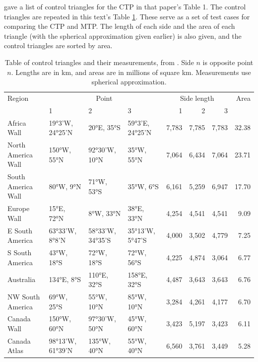 \documentclass[]{interact}
\begin{document}
\citet{christensen} gave a list of control triangles for the CTP in that
paper's Table 1. The control triangles are repeated in this text's Table
\ref{table:ctrlpts}. These serve as a set of test cases for comparing the CTP
and MTP. The length of each side and the area of each triangle
(with the spherical approximation
given earlier) is also given, and the control triangles are sorted by area.

\begin{table}
\begin{tabular}{ p{2.5cm} | p{1.3cm} p{1.3cm} p{1.4cm} | r r r | r }
Region & \multicolumn{3}{c}{Point} &
  \multicolumn{3}{c}{Side length} &  Area \\
& 1 & 2 & 3 & 1 & 2 & 3 & \\
\hline
Africa Wall & 19°3'W, 24°25'N & 20°E, 35°S & 59°3'E, 24°25'N &
  7,783 & 7,785 & 7,783 & 32.38 \\
North \mbox{America} Wall & 150°W, 55°N & 92°30'W, 10°N & 35°W, 55°N &
  7,064 & 6,434 & 7,064 & 23.71 \\
South \mbox{America} Wall & 80°W, 9°N & 71°W, 53°S & 35°W, 6°S &
  6,161 & 5,259 & 6,947 & 17.70 \\
Europe Wall & 15°E, 72°N & 8°W, 33°N & 38°E, 33°N &
  4,254 & 4,541 & 4,541 & 9.09 \\
E South \mbox{America} & 63°33'W, 8°8'N & 58°33'W, 34°35'S & 35°13'W, 5°47'S &
  4,000 & 3,502 & 4,779 & 7.25 \\
S South \mbox{America} & 43°W, 18°S & 72°W, 18°S & 72°W, 56°S &
  4,225 & 4,874 & 3,064 & 6.77 \\
Australia & 134°E, 8°S & 110°E, 32°S & 158°E, 32°S &
  4,487 & 3,643 & 3,643 & 6.76 \\
NW South \mbox{America} & 69°W, 25°S & 55°W, 10°N & 85°W, 10°N &
  3,284 & 4,261 & 4,177 & 6.70 \\
Canada Wall & 150°W, 60°N & 97°30'W, 50°N & 45°W, 60°N &
  3,423 & 5,197 & 3,423 & 6.11 \\
Canada \mbox{Atlas} & 98°13'W, 61°39'N & 135°W, 40°N & 55°W, 40°N &
  6,560 & 3,761 & 3,449 & 5.28
\end{tabular}
\caption{Table of control triangles and their measurements, from
\citet{christensen}. Side $n$ is opposite point $n$. Lengths are in km,
and areas are in millions of square km.
Measurements use spherical approximation.}
\label{table:ctrlpts}
\end{table}
\end{document}
